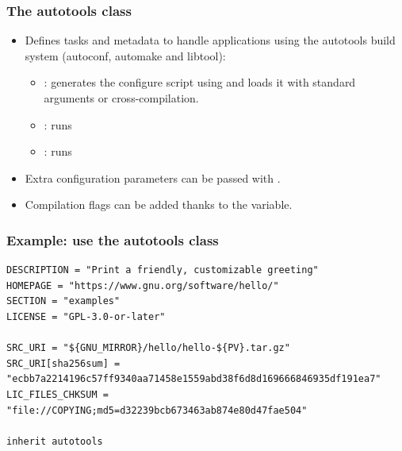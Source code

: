 \begin{frame}
  \frametitle{The autotools class}
  \begin{itemize}
    \item Defines tasks and metadata to handle applications using the
          autotools build system (autoconf, automake and libtool):
    \begin{itemize}
      \item {}: generates the configure script using
             and loads it with standard arguments or
            cross-compilation.
      \item {}: runs 
      \item {}: runs 
    \end{itemize}
    \item Extra configuration parameters can be passed with
          .
    \item Compilation flags can be added thanks to the
           variable.
  \end{itemize}
\end{frame}

\begin{frame}[fragile]
  \frametitle{Example: use the autotools class}
  \begin{block}{}
    \begin{verbatim}
DESCRIPTION = "Print a friendly, customizable greeting"
HOMEPAGE = "https://www.gnu.org/software/hello/"
SECTION = "examples"
LICENSE = "GPL-3.0-or-later"

SRC_URI = "${GNU_MIRROR}/hello/hello-${PV}.tar.gz"
SRC_URI[sha256sum] = "ecbb7a2214196c57ff9340aa71458e1559abd38f6d8d169666846935df191ea7"
LIC_FILES_CHKSUM = "file://COPYING;md5=d32239bcb673463ab874e80d47fae504"

inherit autotools
    \end{verbatim}
  \end{block}
\end{frame}

